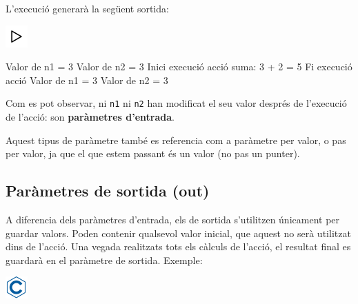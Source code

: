\documentclass[]{book}
\newenvironment{Shaded}{\begin{snugshade}}{\end{snugshade}}
\newcommand{\DecValTok}[1]{\textcolor[rgb]{0.00,0.00,0.81}{#1}}
\newcommand{\NormalTok}[1]{#1}
\begin{document}
L'execució generarà la següent sortida:

\includegraphics{./img/play.png}

\begin{Shaded}
\begin{Highlighting}[]
\NormalTok{Valor de n1 = }\DecValTok{3}
\NormalTok{Valor de n2 = }\DecValTok{3}
\NormalTok{Inici execució acció}
\NormalTok{suma: }\DecValTok{3}\NormalTok{ + }\DecValTok{2}\NormalTok{ = }\DecValTok{5}
\NormalTok{Fi execució acció}
\NormalTok{Valor de n1 = }\DecValTok{3}
\NormalTok{Valor de n2 = }\DecValTok{3}
\end{Highlighting}
\end{Shaded}

Com es pot observar, ni \texttt{n1} ni \texttt{n2} han modificat el seu
valor després de l'execució de l'acció: son \textbf{paràmetres
d'entrada}.

Aquest tipus de paràmetre també es referencia com a paràmetre per valor,
o pas per valor, ja que el que estem passant és un valor (no pas un
punter).

\subsection{Paràmetres de sortida
(out)}\label{parametres-de-sortida-out}

A diferencia dels paràmetres d'entrada, els de sortida s'utilitzen
únicament per guardar valors. Poden contenir qualsevol valor inicial,
que aquest no serà utilitzat dins de l'acció. Una vegada realitzats tots
els càlculs de l'acció, el resultat final es guardarà en el paràmetre de
sortida. Exemple:

\includegraphics{./img/c.png}
\end{document}

